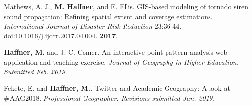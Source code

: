 \begin{cventries}
   \cventry
      {}
      {}
      {}
      {}
      {
        \begin{cvitems}
          \vspace{-4mm}
        \item {Mathews, A. J., \textbf{M. Haffner}, and E. Ellis. GIS-based modeling
            of tornado siren sound propagation: Refining spatial extent and
            coverage estimations. \textit{International Journal of Disaster Risk
              Reduction} 23:36-44.
            \href{https://doi.org/10.1016/j.ijdrr.2017.04.004}{doi:10.1016/j.ijdrr.2017.04.004}.}
          \textbf{2017}.\\
          \vspace{-2mm}
        \end{cvitems}
    }

\end{cventries}

\newpage



\begin{cventries}
   \cventry
      {}
      {}
      {}
      {}
      {
        \begin{cvitems}
          \vspace{-4mm}
        \item
          {\textbf{Haffner, M.} and J. C. Comer.
            An interactive point pattern analysis web application and teaching
            exercise. \textit{Journal of Geography in Higher Education.
              Submitted Feb. 2019}.} \\
          \vspace{-2mm}
        \end{cvitems}
    }

   \cventry
      {}
      {}
      {}
      {}
      {
        \begin{cvitems}
          \vspace{-4mm}
        \item
          {Fekete, E. and \textbf{Haffner, M.}.
            Twitter and Academic Geography: A look at \#AAG2018.
            \textit{Professional Geographer. Revisions submitted Jan. 2019}.} \\
          \vspace{-2mm}
        \end{cvitems}
    }

\end{cventries}

